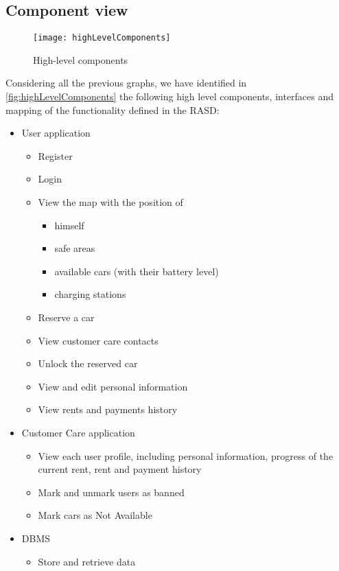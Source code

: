 \subsection{Component view}
\begin{figure}[h]
	\centering
	\texttt{[image: highLevelComponents]}
	\caption{
		\label{fig:highLevelComponents} 
		High-level components
	}
\end{figure}

Considering all the previous graphs, we have identified in \autoref{fig:highLevelComponents} the following high level components, interfaces and mapping of the functionality defined in the RASD:
\begin{itemize}

	\item User application
	\begin{itemize}
		\item Register
		\item Login
		\item View the map with the position of
		\begin{itemize}
			\item himself
			\item safe areas
			\item available cars (with their battery level)
			\item charging stations
		\end{itemize}
		\item Reserve a car
		\item View customer care contacts
		\item Unlock the reserved car
		\item View and edit personal information
		\item View rents and payments history
	\end{itemize}
	
	\item Customer Care application
	\begin{itemize}
		\item View each user profile, including personal information, progress of the current rent, rent and payment history
		\item Mark and unmark users as banned
		\item Mark cars as Not Available
	\end{itemize}
	
	\item DBMS
	\begin{itemize}
		\item Store and retrieve data
	\end{itemize}	
	

\end{itemize}
